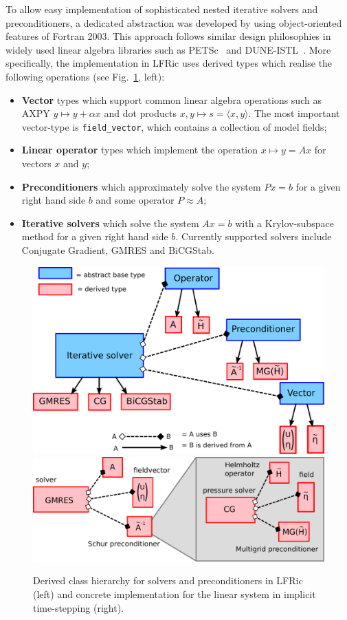 \documentclass[review,times]{elsarticle}
\begin{document}
To allow easy implementation of sophisticated nested iterative solvers
and preconditioners, a dedicated abstraction was developed by using
object-oriented features of Fortran 2003. This approach
follows similar design philosophies in widely used linear algebra
libraries such as PETSc~\cite{Balay1997,Balay2018} and DUNE-ISTL~\cite{Blatt2007}. 
More specifically, the implementation in LFRic uses
derived types which realise the following operations (see
Fig.~\ref{fig:class_hierarchy}, left):
\begin{itemize}
\item \textbf{Vector} types which support common linear algebra
  operations such as AXPY $y\mapsto y+\alpha x$ and dot products
  $x,y\mapsto s = \langle x,y\rangle$. The most important vector-type
  is \texttt{field\_vector}, which contains a collection of model
  fields;
\item \textbf{Linear operator} types which implement the operation $x\mapsto y=Ax$ for vectors $x$ and $y$;
\item \textbf{Preconditioners} which approximately solve the system $Px=b$ for a
  given right hand side $b$ and some operator $P\approx A$;
\item \textbf{Iterative solvers} which solve the system $Ax=b$ with a
  Krylov-subspace method for a given right hand side $b$. Currently
  supported solvers include Conjugate Gradient, GMRES and BiCGStab.
\end{itemize}
\begin{figure}
  \begin{center}
    \includegraphics[width=0.45\linewidth]{Fig6a_class_hierarchy.pdf}
    \hfill
    \includegraphics[width=0.45\linewidth]{Fig6b_class_concrete.pdf}
    \caption{Derived class hierarchy for solvers and preconditioners
      in LFRic (left) and concrete implementation for the linear
      system in implicit time-stepping (right).}
    \label{fig:class_hierarchy}
  \end{center}
\end{figure}
\end{document}

